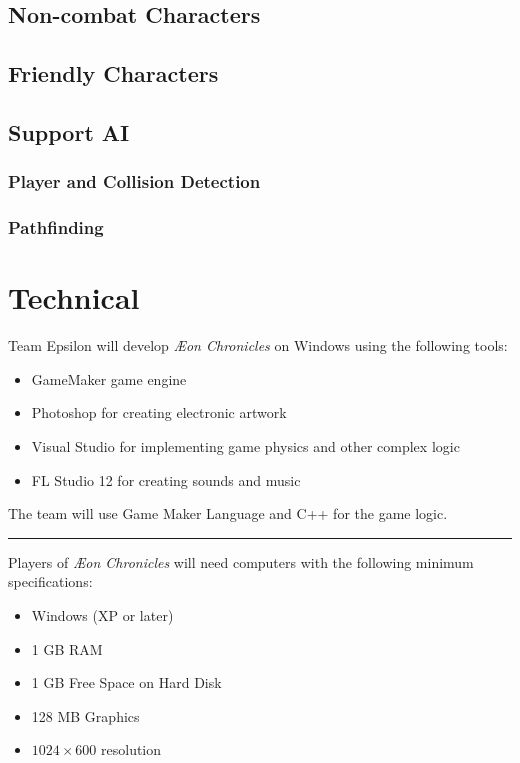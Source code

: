 \documentclass[12pt,titlepage]{article}
\newcommand\gametitle{\textit{\AE on Chronicles}\xspace}
\newcommand\sep{\rule{2.5in}{0.1mm}}
\begin{document}
\subsection{Non-combat Characters}


\subsection{Friendly Characters}

\subsection{Support AI}

\subsubsection{Player and Collision Detection}

\subsubsection{Pathfinding}

\newpage
\section{Technical}
%

Team Epsilon will develop \gametitle on Windows using the following tools:

\begin{itemize}
    \item GameMaker game engine
    \item Photoshop for creating electronic artwork
    \item Visual Studio for implementing game physics and other complex logic
    \item FL Studio 12 for creating sounds and music
\end{itemize}

The team will use Game Maker Language and C++ for the game logic.

\sep

Players of \gametitle will need computers with the following minimum
specifications:

\begin{itemize}
    \item Windows (XP or later)
    \item 1 GB RAM
    \item 1 GB Free Space on Hard Disk
    \item 128 MB Graphics
    \item $1024 \times 600$ resolution
\end{itemize}
\end{document}
